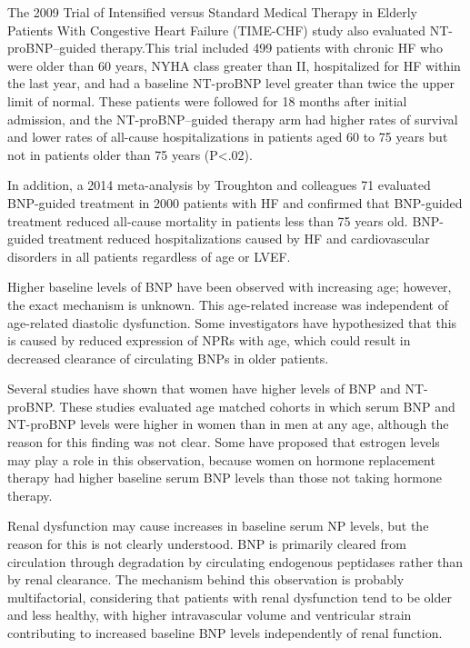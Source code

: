 \documentclass[14pt,a4paper,onecolumn]{extarticle}
\begin{document}
The 2009 Trial of Intensified versus Standard Medical Therapy in Elderly Patients With Congestive Heart Failure (TIME-CHF) study also evaluated NT-proBNP–guided therapy.This trial included 499 patients with chronic HF who were older than 60 years, NYHA class greater than II, hospitalized for HF within the last year, and had a baseline NT-proBNP level greater than twice the upper limit of normal. These patients were followed for 18 months after initial admission, and the NT-proBNP–guided therapy arm had higher rates of survival and lower rates of all-cause hospitalizations in patients aged 60 to 75 years but not in patients older than 75 years (P<.02). \citep{Pfisterer2009} %

In addition, a 2014 meta-analysis by Troughton and colleagues 71 evaluated BNP-guided treatment in 2000 patients with HF and confirmed that BNP-guided treatment reduced all-cause mortality in patients less than 75 years old. BNP-guided treatment reduced hospitalizations caused by HF and cardiovascular disorders in all patients regardless of age or LVEF. \citep{Troughton2014} %

Higher baseline levels of BNP have been observed with increasing age; however, the exact mechanism is unknown. This age-related increase was independent of age-related diastolic dysfunction. Some investigators have hypothesized that this is caused by reduced expression of NPRs with age, which could result in decreased clearance of circulating BNPs in older patients. \citep{Maisel2018} %

Several studies have shown that women have higher levels of BNP and NT-proBNP. These studies evaluated age matched cohorts in which serum BNP and NT-proBNP levels were higher in women than in men at any age, although the reason for this finding was not clear. Some have proposed that estrogen levels may play a role in this observation, because women on hormone replacement therapy had higher baseline serum BNP levels than those not taking hormone therapy. \citep{Maisel2018} %

Renal dysfunction may cause increases in baseline serum NP levels, but the reason for this is not clearly understood. BNP is primarily cleared from circulation through degradation by circulating endogenous peptidases rather than by renal clearance. The mechanism behind this observation is probably multifactorial, considering that patients with renal dysfunction tend to be older and less healthy, with higher intravascular volume and ventricular strain contributing to increased baseline BNP levels independently of renal function. \citep{Maisel2018} %
\end{document}
